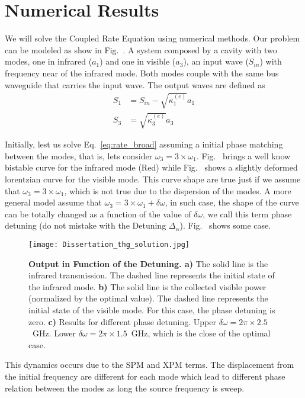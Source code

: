 \section{Numerical Results}

We will solve the Coupled Rate Equation using numerical methods. Our problem can be modeled as show in Fig.~. A system composed by a cavity with two modes, one in infrared ($a_1$) and one in visible ($a_3$), an input wave ($S_{in}$) with frequency near of the infrared mode. Both modes couple with the same bus waveguide that carries the input wave. The output waves are defined as 
\begin{subequations}
    \begin{align}
        S_1 &= S_{in} - \sqrt{\kappa^{(e)}_1}a_1\\
        S_3 &= \sqrt{\kappa^{(e)}_3}a_3
        \label{eq:out_wave}
    \end{align}
\end{subequations}

Initially, lest us solve Eq.~\ref{eq:rate_broad} assuming a initial phase matching between the modes, that is, lets consider $\omega_3 = 3\times\omega_1$. Fig.~
brings a well know bistable curve for the infrared mode (Red) while Fig.~ 
shows a slightly deformed lorentzian curve for the visible mode. This curve shape are true just if we assume that $\omega_3 = 3\times\omega_1$, which is not true due to the dispersion of the modes. A more general model assume that $\omega_3 = 3\times\omega_1 + \delta\omega$, in such case, the shape of the curve can be totally changed as a function of the value of $\delta\omega$, we call this term phase detuning (do not mistake with the Detuning $\Delta_\alpha$). Fig.~
shows some case. 

\begin{figure}[!h]
    \centering
    \texttt{[image: Dissertation\_thg\_solution.jpg]}
    \caption{\textbf{Output in Function of the Detuning. a)} The solid line is the infrared transmission. The dashed line represents the initial state of the infrared mode. \textbf{b)} The solid line is the collected visible power (normalized by the optimal value). The dashed line represents the initial state of the visible mode. For this case, the phase detuning is zero. \textbf{c)} Results for different phase detuning. Upper $\delta\omega = 2\pi\times2.5$~GHz. Lower $\delta\omega = 2\pi\times1.5$~GHz, which is the close of the optimal case.}
    \label{fig:temporal_solution}
\end{figure}
This dynamics occurs due to the SPM and XPM terms. The displacement from the initial frequency are different for each mode which lead to different phase relation between the modes as long the source frequency is sweep. 

